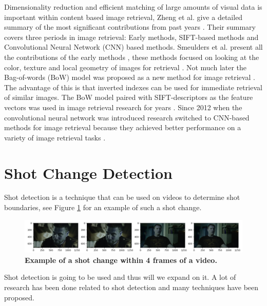 \documentclass{report}
\begin{document}
Dimensionality reduction and efficient matching of large amounts of visual data is important within content based image retrieval, Zheng et al. give a detailed summary of the most significant contributions from past years \cite{zheng2018sift}. Their summary covers three periods in image retrieval: Early methods, SIFT-based methods and Convolutional Neural Network (CNN) based methods. Smeulders et al. present all the contributions of the early methods \cite{smeulders2000content}, these methods focused on looking at the color, texture and local geometry of images for retrieval \cite{yu2002color,manjunath1996texture}. Not much later the Bag-of-words (BoW) model was proposed as a new method for image retrieval \cite{sivic2003video}. The advantage of this is that inverted indexes can be used for immediate retrieval of similar images. The BoW model paired with SIFT-descriptors \cite{lowe2004distinctive} as the feature vectors was used in image retrieval research for years \cite{nister2006scalable,philbin2007object,jegou2008hamming,jegou2010aggregating,jegou2012aggregating}. Since 2012 when the convolutional neural network was introduced \cite{krizhevsky2012imagenet} research switched to CNN-based methods for image retrieval because they achieved better performance on a variety of image retrieval tasks	 \cite{babenko2014neural,yue2015exploiting, tolias2015particular}.

\section{Shot Change Detection}

Shot detection is a technique that can be used on videos to determine shot boundaries, see Figure \ref{shotchange} for an example of such a shot change. 

\begin{figure}[H]
	\includegraphics[width=12cm]{images/shotchange.jpg}
	\centering
	\caption{\textbf{Example of a shot change within 4 frames of a video.}}
	\label{shotchange}
\end{figure}

Shot detection is going to be used and thus will we expand on it. A lot of research has been done related to shot detection \cite{lienhart1998comparison} and many techniques have been proposed. 
\end{document}
